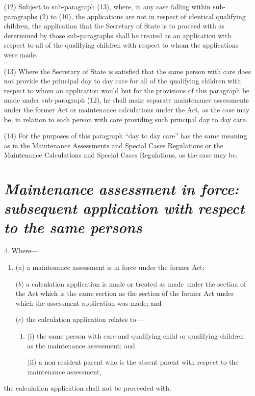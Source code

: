 \documentclass[12pt,a4paper]{article}
\begin{document}
(12) Subject to sub-paragraph (13), where, in any case falling within sub-paragraphs (2) to (10), the applications are not in respect of identical qualifying children, the application that the Secretary of State is to proceed with as determined by those sub-paragraphs shall be treated as an application with respect to all of the qualifying children with respect to whom the applications were made.

(13) Where the Secretary of State is satisfied that the same person with care does not provide the principal day to day care for all of the qualifying children with respect to whom an application would but for the provisions of this paragraph be made under sub-paragraph (12), he shall make separate maintenance assessments under the former Act or maintenance calculations under the Act, as the case may be, in relation to each person with care providing such principal day to day care.

(14) For the purposes of this paragraph “day to day care” has the same meaning as in the Maintenance Assessments and Special Cases Regulations or the Maintenance Calculations and Special Cases Regulations, as the case may be.

\section*{\itshape Maintenance assessment in force: subsequent application with respect to the same persons}

4.  Where—
\begin{enumerate}\item[]
($a$) a maintenance assessment is in force under the former Act;

($b$) a calculation application is made or treated as made under the section of the Act which is the same section as the section of the former Act under which the assessment application was made; and

($c$) the calculation application relates to—
\begin{enumerate}\item[]
(i) the same person with care and qualifying child or qualifying children as the maintenance assessment; and

(ii) a non-resident parent who is the absent parent with respect to the maintenance assessment,
\end{enumerate}
\end{enumerate}
the calculation application shall not be proceeded with.
\end{document}
